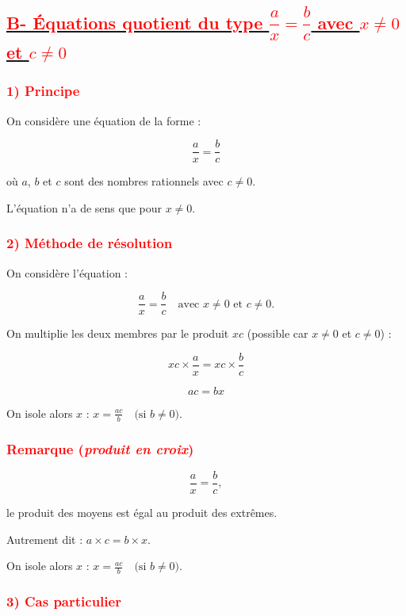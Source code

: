 \documentclass[12pt,a4paper]{article}
\begin{document}
\subsection*{\underline{\textcolor{red}{B- Équations quotient du type $\dfrac{a}{x} =\dfrac{b}{c}$ avec $x\neq 0$ et $c\neq 0$}}}

\subsubsection*{\textcolor{red}{1) Principe}}

On considère une équation de la forme :

\[
\frac{a}{x} = \frac{b}{c}
\]

où $a$, $b$ et $c$ sont des nombres rationnels avec $c \neq 0$.

L’équation n’a de sens que pour $x \neq 0$.

\vspace{0.4cm}
\subsubsection*{\textcolor{red}{2) Méthode de résolution}}

On considère l’équation :

\[
\frac{a}{x} = \frac{b}{c}
\quad \text{avec } x \neq 0 \text{ et } c \neq 0.
\]

On multiplie les deux membres par le produit $xc$ (possible car $x \neq 0$ et $c \neq 0$) :

\[
xc \times \frac{a}{x} = xc \times \frac{b}{c}
\]

\[
ac = bx
\]

On isole alors $x$ :
$
x = \frac{ac}{b}
\quad \text{(si } b \neq 0\text{)}.
$

\subsubsection*{\textcolor{red}{ Remarque (\textit{produit en croix})}}  

\[
\frac{a}{x} = \frac{b}{c},
\]

le produit des moyens est égal au produit des extrêmes.

Autrement dit : $a \times c = b \times x.$

On isole alors $x$ :
$
x = \frac{ac}{b}
\quad \text{(si } b \neq 0\text{)}.
$

\subsubsection*{\textcolor{red}{3) Cas particulier}}
\end{document}
